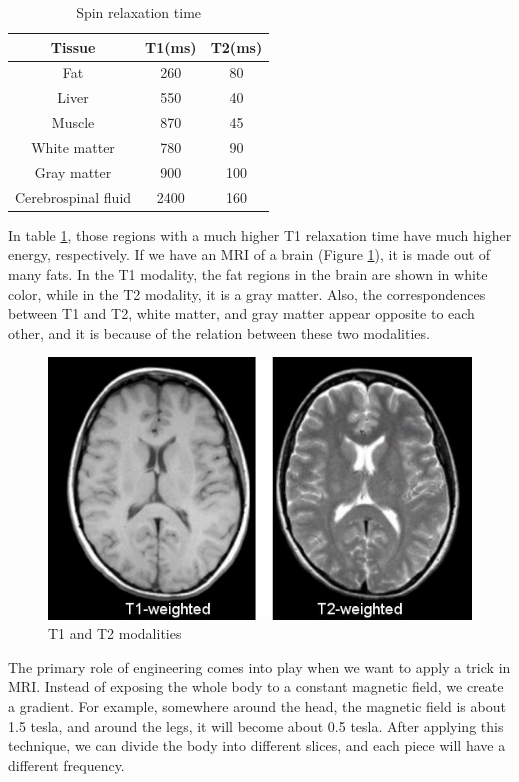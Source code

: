 \begin{table}[h]
	\centering
	\caption{Spin relaxation time}
	\label{tab1}
	\renewcommand{\arraystretch}{1.2}
	\begin{tabular}{|c|c|c|}
		\hline
		\textbf{Tissue}              & \textbf{T1(ms)} & \textbf{T2(ms)} \\ \hline
		Fat                 & 260             & 80              \\ \hline
		Liver               & 550             & 40              \\ \hline
		Muscle             & 870             & 45              \\ \hline
		White matter        & 780             & 90              \\ \hline
		Gray matter         & 900             & 100             \\ \hline
		Cerebrospinal fluid & 2400            & 160             \\ \hline
	\end{tabular}
\end{table}


In table \ref{tab1}, those regions with a much higher T1 relaxation time have much higher energy, respectively. If we have an MRI of a brain (Figure \ref{fig10}), it is made out of many fats. In the T1 modality, the fat regions in the brain are shown in white color, while in the T2 modality, it is a gray matter. Also, the correspondences between T1 and T2, white matter, and gray matter appear opposite to each other, and it is because of the relation between these two modalities.

\begin{figure}[htbp]
	\centering \includegraphics[width=0.5\columnwidth]{./figures/Fig10.jpg}
	\caption{T1 and T2 modalities}
	\label{fig10}
\end{figure}

The primary role of engineering comes into play when we want to apply a trick in MRI. Instead of exposing the whole body to a constant magnetic field, we create a gradient. For example, somewhere around the head, the magnetic field is about 1.5 tesla, and around the legs, it will become about 0.5 tesla. After applying this technique, we can divide the body into different slices, and each piece will have a different frequency.

